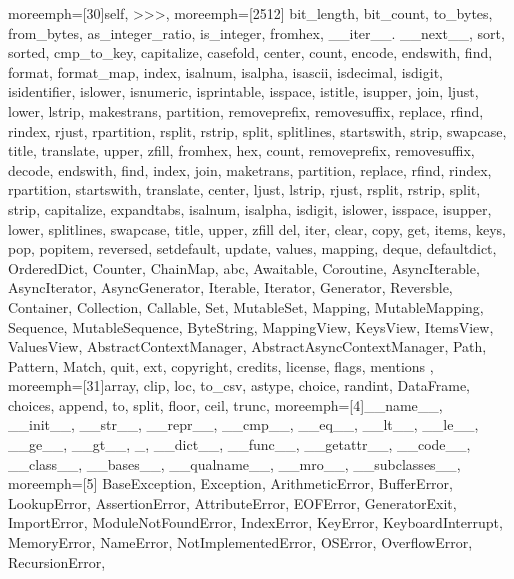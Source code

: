 {  moreemph=[30]{self, >>>},
  moreemph=[2512]{%
  bit\_length, bit\_count, to\_bytes, from\_bytes, as\_integer\_ratio,
  is\_integer, fromhex,
  \_\_iter\_\_. \_\_next\_\_,
  sort, sorted, cmp\_to\_key,
  capitalize, casefold, center, count, encode, endswith, find, format,
  format\_map, index, isalnum, isalpha, isascii, isdecimal, isdigit,
  isidentifier, islower, isnumeric, isprintable, isspace, istitle, isupper,
  join, ljust, lower, lstrip, makestrans, partition, removeprefix,
  removesuffix, replace, rfind, rindex, rjust, rpartition, rsplit, rstrip,
  split, splitlines, startswith, strip, swapcase, title, translate, upper,
  zfill,
  fromhex, hex,
  count, removeprefix, removesuffix, decode, endswith, find, index, join,
  maketrans, partition, replace, rfind, rindex, rpartition, startswith,
  translate, center, ljust, lstrip, rjust, rsplit, rstrip, split, strip,
  capitalize, expandtabs, isalnum, isalpha, isdigit, islower, isspace,
  isupper, lower, splitlines, swapcase, title, upper, zfill
  del, iter, clear, copy, get, items, keys, pop, popitem, reversed,
  setdefault, update, values, mapping,
  deque, defaultdict, OrderedDict, Counter, ChainMap, abc, Awaitable,
  Coroutine, AsyncIterable, AsyncIterator, AsyncGenerator, Iterable, Iterator,
  Generator, Reversble, Container, Collection, Callable, Set, MutableSet,
  Mapping, MutableMapping, Sequence, MutableSequence, ByteString, MappingView,
  KeysView, ItemsView, ValuesView,
  AbstractContextManager, AbstractAsyncContextManager,
  Path,
  Pattern, Match,
  quit, ext, copyright, credits, license, flags, mentions
  },
  moreemph=[31]{array, clip, loc, to\_csv, astype, choice, randint, DataFrame,
  choices, append, to, split, floor, ceil, trunc},
  moreemph=[4]{\_\_name\_\_, \_\_init\_\_, \_\_str\_\_, \_\_repr\_\_,
  \_\_cmp\_\_, \_\_eq\_\_, \_\_lt\_\_, \_\_le\_\_, \_\_ge\_\_, \_\_gt\_\_, \_,
  \_\_dict\_\_, \_\_func\_\_, \_\_getattr\_\_, \_\_code\_\_, \_\_class\_\_,
  \_\_bases\_\_, \_\_qualname\_\_, \_\_mro\_\_, \_\_subclasses\_\_},
  moreemph=[5]{%
  BaseException, Exception, ArithmeticError, BufferError, LookupError,
  AssertionError, AttributeError, EOFError, GeneratorExit, ImportError,
  ModuleNotFoundError, IndexError, KeyError, KeyboardInterrupt, MemoryError,
  NameError, NotImplementedError, OSError, OverflowError, RecursionError,
}}
